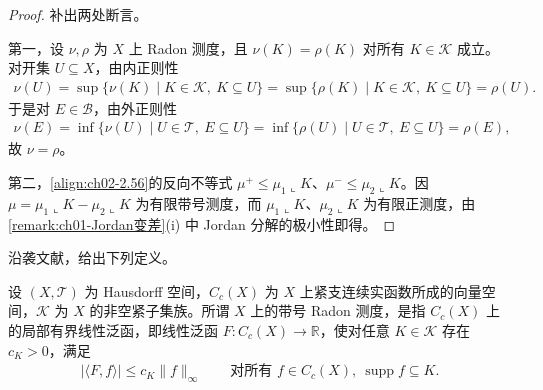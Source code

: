 \documentclass[../../main.tex]{subfiles}%
\begin{document}
\begin{proof}
补出两处断言。

第一，设 $\nu,\rho$ 为 $X$ 上 Radon 测度，且 $\nu(K)=\rho(K)$ 对所有 $K\in\mathscr K$ 成立。对开集 $U\subseteq X$，由内正则性
\begin{align*}
\nu(U)=\sup\{\nu(K)\mid K\in\mathscr K,\ K\subseteq U\}=\sup\{\rho(K)\mid K\in\mathscr K,\ K\subseteq U\}=\rho(U).
\end{align*}
于是对 $E\in\mathscr B$，由外正则性
\begin{align*}
\nu(E)=\inf\{\nu(U)\mid U\in\mathscr T,\ E\subseteq U\}=\inf\{\rho(U)\mid U\in\mathscr T,\ E\subseteq U\}=\rho(E),
\end{align*}
故 $\nu=\rho$。

第二，\eqref{align:ch02-2.56}的反向不等式 $\mu^+\leqslant\mu_1\llcorner K$、$\mu^-\leqslant\mu_2\llcorner K$。因 $\mu=\mu_1\llcorner K-\mu_2\llcorner K$ 为有限带号测度，而 $\mu_1\llcorner K$、$\mu_2\llcorner K$ 为有限正测度，由\cref{remark:ch01-Jordan变差}(i) 中 Jordan 分解的极小性即得。
\end{proof}

沿袭文献\cite{ref24}，给出下列定义。

\begin{definition}[带号 Radon 测度]\label{definition:ch02-带号Radon测度泛函}
设 $(X,\mathscr T)$ 为 Hausdorff 空间，$C_c(X)$ 为 $X$ 上紧支连续实函数所成的向量空间，$\mathscr K$ 为 $X$ 的非空紧子集族。所谓 $X$ 上的带号 Radon 测度，是指 $C_c(X)$ 上的局部有界线性泛函，即线性泛函 $F:C_c(X)\to\mathbb R$，使对任意 $K\in\mathscr K$ 存在 $c_K>0$，满足
\begin{align*}
|\langle F,f\rangle|\leqslant c_K\|f\|_\infty\qquad\text{对所有 }f\in C_c(X),\ \operatorname{supp}f\subseteq K.
\end{align*}
\end{definition}
\end{document}
